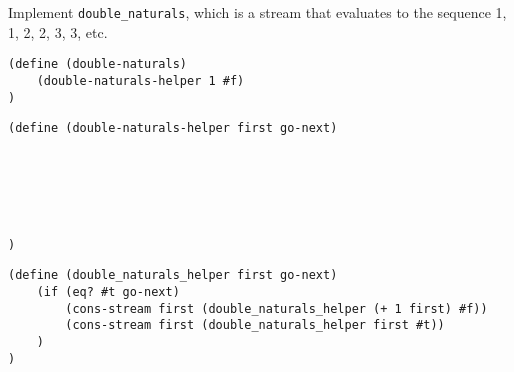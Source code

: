 \begin{blocksection}
\question Implement \lstinline$double_naturals$, which is a stream that evaluates to the sequence 1, 1, 2, 2, 3, 3, etc.

\begin{lstlisting}
(define (double-naturals)
    (double-naturals-helper 1 #f)
)
\end{lstlisting}

\ifprintanswers\else
\begin{lstlisting}
(define (double-naturals-helper first go-next)






)
\end{lstlisting}
\fi

\begin{solution}[1in]
\begin{lstlisting}
(define (double_naturals_helper first go-next)
    (if (eq? #t go-next)
        (cons-stream first (double_naturals_helper (+ 1 first) #f))
        (cons-stream first (double_naturals_helper first #t))
    )
)
\end{lstlisting}
\end{solution}
\end{blocksection}
